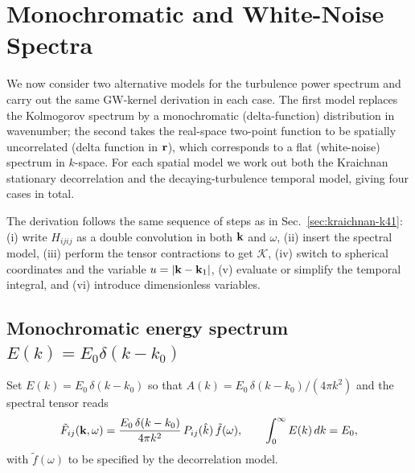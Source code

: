 \documentclass[10pt,prd,aps,nobibnotes,superscriptaddress,preprintnumbers,notitlepage]{revtex4-1}
\newcommand{\khat}{\hat{k}}
\newcommand{\br}{{\bf r}}
\newcommand{\kb}{{\bf k}}
\newcommand{\tf}{\tilde{f}}
\begin{document}
\section{Monochromatic and White-Noise Spectra}
\label{sec:monochromatic-white}

We now consider two alternative models for the turbulence power spectrum and carry out the same GW-kernel derivation in each case. The first model replaces the Kolmogorov spectrum by a monochromatic (delta-function) distribution in wavenumber; the second takes the real-space two-point function to be spatially uncorrelated (delta function in $\br$), which corresponds to a flat (white-noise) spectrum in $k$-space. For each spatial model we work out both the Kraichnan stationary decorrelation and the decaying-turbulence temporal model, giving four cases in total.

The derivation follows the same sequence of steps as in Sec.~\ref{sec:kraichnan-k41}: (i) write $H_{ijij}$ as a double convolution in both $\kb$ and $\omega$, (ii) insert the spectral model, (iii) perform the tensor contractions to get $\mathcal{K}$, (iv) switch to spherical coordinates and the variable $u=|\kb-\kb_1|$, (v) evaluate or simplify the temporal integral, and (vi) introduce dimensionless variables.

\subsection{\texorpdfstring{Monochromatic energy spectrum $E(k)=E_0\delta(k-k_0)$}{Monochromatic energy spectrum E(k)=E0 delta(k-k0)}}
\label{sec:delta-k}

Set $E(k)=E_0\,\delta(k-k_0)$ so that $A(k) = E_0\,\delta(k-k_0)/(4\pi k^2)$ and the spectral tensor reads
\begin{equation}
  \tilde{F}_{ij}(\kb,\omega) = \frac{E_0\,\delta(k-k_0)}{4\pi k^2}\,P_{ij}(\khat)\,\tf(\omega),
  \qquad \int_0^\infty E(k)\,dk = E_0,
  \label{eq:Fij-delta-k}
\end{equation}
with $\tf(\omega)$ to be specified by the decorrelation model.
\end{document}
